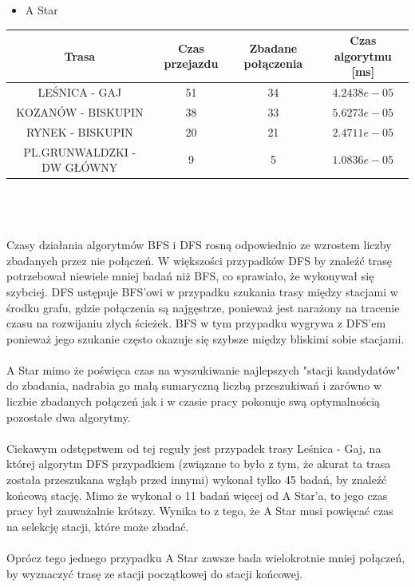 \documentclass[13pt]{article}
\begin{document}
\begin{itemize}
\item A Star
\end{itemize}
\begin{tabular}{|c|c|c|c|} \hline
Trasa & Czas przejazdu  & Zbadane połączenia & Czas algorytmu [ms]\\
\hline \hline
 LEŚNICA - GAJ & 51 & 34 &  $4.2438e-05$ \\
 \hline
 KOZANÓW - BISKUPIN & 38 & 33 &  $5.6273e-05$ \\
 \hline
 RYNEK - BISKUPIN & 20 & 21 & $2.4711e-05$ \\
 \hline
 PL.GRUNWALDZKI - DW GŁÓWNY & 9 & 5 &  $1.0836e-05$\\
 \hline
\end{tabular}\\\\\\
Czasy działania algorytmów BFS i DFS rosną odpowiednio ze wzrostem liczby zbadanych przez nie połączeń. W większości przypadków DFS by znaleźć trasę potrzebował niewiele mniej badań niż BFS, co sprawiało, że wykonywał się szybciej. DFS ustępuje BFS'owi w przypadku szukania trasy między stacjami w środku grafu, gdzie połączenia są najgęstrze, ponieważ jest narażony na tracenie czasu na rozwijaniu złych ścieżek. BFS w tym przypadku wygrywa z DFS'em ponieważ jego szukanie często okazuje się szybsze między bliskimi sobie stacjami.\\\\
A Star mimo że poświęca czas na wyszukiwanie najlepszych "stacji kandydatów" do zbadania, nadrabia go małą sumaryczną liczbą przeszukiwań i zarówno w  liczbie zbadanych połączeń jak i w czasie pracy pokonuje swą optymalnością pozostałe dwa algorytmy.\\\\
Ciekawym odstępstwem od tej reguły jest przypadek trasy Leśnica - Gaj, na której algorytm DFS przypadkiem (związane to było z tym, że akurat ta trasa została przeszukana wgłąb przed innymi) wykonał tylko 45 badań, by znaleźć końcową stację. Mimo że wykonał o 11 badań więcej od A Star'a, to jego czas pracy był zauważalnie krótszy. Wynika to z tego, że A Star musi powięcać czas na selekcję stacji, które może zbadać.\\\\
Oprócz tego jednego przypadku A Star zawsze bada wielokrotnie mniej połączeń, by wyznaczyć trasę ze stacji początkowej do stacji końcowej.\\\\
\end{document}
